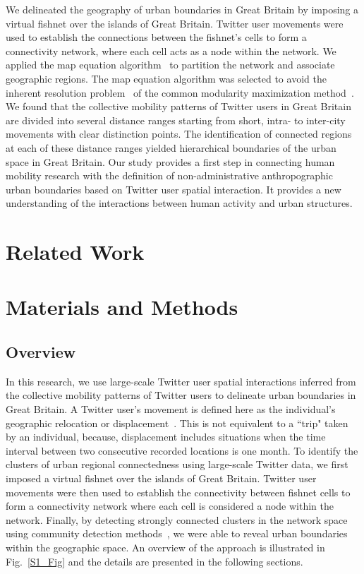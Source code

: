 \documentclass[]{tGIS2e}
\begin{document}
We delineated the geography of urban boundaries in Great Britain by imposing a virtual fishnet over the islands of Great Britain.
Twitter user movements were used to establish the connections between the fishnet's cells to form a connectivity network, where each cell acts as a node within the network.
We applied the map equation algorithm~\citep{domenico2015} to partition the network and associate geographic regions.
The map equation algorithm was selected to avoid the inherent resolution problem~\citep{fortunato2007} of the common modularity maximization method~\citep{newman2006}. 
We found that the collective mobility patterns of Twitter users in Great Britain are divided into several distance ranges starting from short, intra- to inter-city movements with clear distinction points. 
The identification of connected regions at each of these distance ranges yielded hierarchical boundaries of the urban space in Great Britain.
Our study provides a first step in connecting human mobility research with the definition of non-administrative anthropographic urban boundaries based on Twitter user spatial interaction. 
It provides a new understanding of the interactions between human activity and urban structures. 

\section{Related Work}


\section{Materials and Methods}
\subsection{Overview}
In this research, we use large-scale Twitter user spatial interactions inferred from the collective mobility patterns of Twitter users to delineate urban boundaries in Great Britain.
A Twitter user's movement is defined here as the individual's geographic relocation or displacement~\citep{gonzalez2008}.
This is not equivalent to a ``trip" taken by an individual, because, displacement includes situations when the time interval between two consecutive recorded locations is one month.
To identify the clusters of urban regional connectedness using large-scale Twitter data, we first imposed a virtual fishnet over the islands of Great Britain.
Twitter user movements were then used to establish the connectivity between fishnet cells to form a connectivity network where each cell is considered a node within the network. 
Finally, by detecting strongly connected clusters in the network space using community detection methods~\citep{coscia2011}, we were able to reveal urban boundaries within the geographic space. 
An overview of the approach is illustrated in Fig.~\ref{S1_Fig} and the details are presented in the following sections. 
\end{document}
